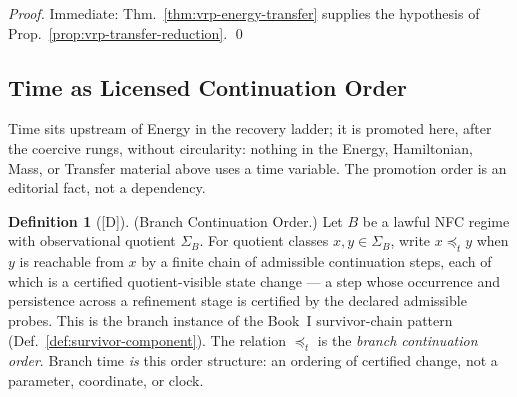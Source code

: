 \documentclass[12pt,oneside]{amsbook}
\theoremstyle{plain}
\theoremstyle{definition}
\newtheorem{definition}[theorem]{Definition}
\theoremstyle{remark}
\newcommand{\status}[1]{\textup{[#1]}}
\begin{document}
\begin{proof}
Immediate: Thm.~\ref{thm:vrp-energy-transfer} supplies the
hypothesis of Prop.~\ref{prop:vrp-transfer-reduction}. \qed
\end{proof}

\subsection{Time as Licensed Continuation Order}
\label{sec:vrp-time}

Time sits upstream of Energy in the recovery ladder; it is
promoted here, after the coercive rungs, without circularity:
nothing in the Energy, Hamiltonian, Mass, or Transfer material
above uses a time variable.  The promotion order is an editorial
fact, not a dependency.

\begin{definition}[\status{D}]\label{def:branch-time-order}
\textup{(Branch Continuation Order.)}
Let $B$ be a lawful NFC regime with observational quotient
$\Sigma_B$.  For quotient classes $x, y \in \Sigma_B$, write
$x \preceq_t y$ when $y$ is reachable from $x$ by a finite chain
of admissible continuation steps, each of which is a certified
quotient-visible state change --- a step whose occurrence and
persistence across a refinement stage is certified by the declared
admissible probes.  This is the branch instance of the Book~I
survivor-chain pattern (Def.~\ref{def:survivor-component}).  The
relation $\preceq_t$ is the \emph{branch continuation order}.
Branch time \emph{is} this order structure: an ordering of
certified change, not a parameter, coordinate, or clock.
\end{definition}
\end{document}
